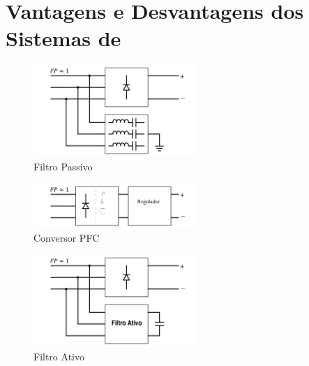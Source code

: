 \section{Vantagens e Desvantagens dos Sistemas de }

\begin{figure}[!htbp]
	\centering
	\includegraphics[width=0.55\textwidth]{Cap2/Figuras/sch_filtro_passivo.png}
	\caption{Filtro Passivo}
	\label{fig:sch_filtro_passivo}
\end{figure}

\begin{figure}[!htbp]
	\centering
	\includegraphics[width=0.55\textwidth]{Cap2/Figuras/sch_PFC.png}
	\caption{Conversor PFC}
	\label{fig:sch_PFC}
\end{figure}

\begin{figure}[!htbp]
	\centering
	\includegraphics[width=0.55\textwidth]{Cap2/Figuras/sch_filtro_ativo.png}
	\caption{Filtro Ativo}
	\label{fig:sch_filtro_ativo}
\end{figure}




